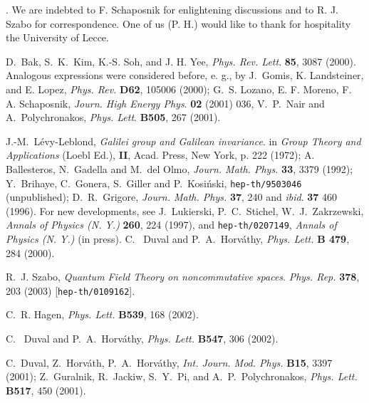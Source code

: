 \documentclass[a4paper,11pt]{article}
\def\parag{\hfil\break} %
\def\kikezd{\parag\underbar}
\begin{document}
\kikezd{Acknowledgement}.
We are indebted to F. Schaposnik
for enlightening discussions and to R. J. Szabo
for correspondence. One of us (P. H.)
would like to thank for hospitality
the University of Lecce.

\begin{thebibliography}{99}
D.~Bak, S.~K.~Kim, K.-S. Soh, and J. H. Yee,
{\sl Phys. Rev. Lett}. {\bf 85}, 3087 (2000).
Analogous expressions were considered before, e. g., by
J.~Gomis, K. Landsteiner, and E. Lopez,
{\sl Phys. Rev.} {\bf D62}, 105006 (2000);
G.~S. Lozano, E. F. Moreno, F. A. Schaposnik,
{\sl Journ. High Energy Phys}. {\bf 02} (2001) 036,
V.~P.~Nair and A.~Polychronakos,
{\sl Phys. Lett}. {\bf B505}, 267 (2001).

J.-M.~L\'evy-Leblond,
{\it Galilei group and Galilean invariance}.
in {\it Group Theory and Applications} (Loebl Ed.),
{\bf II}, Acad. Press, New York, p. 222 (1972);
A. Ballesteros, N.~Gadella and M.~del Olmo,
{\sl Journ. Math. Phys.} {\bf 33}, 3379 (1992);
Y.~Brihaye, C.~Gonera, S.~Giller and P.~Kosi\'nski,
\texttt{hep-th/9503046} (unpublished);
D.~R.~Grigore, {\sl Journ. Math. Phys.} {\bf 37}, 240 and
   {\sl ibid}. {\bf 37} 460 (1996).
For new developments, see
J.~Lukierski, P.~C.~Stichel, W.~J.~Zakrzewski,
   {\sl Annals of Physics (N. Y.)} {\bf 260}, 224 (1997), and
   \texttt{hep-th/0207149}, {\sl Annals of Physics (N. Y.)}
   (in press).
C.~ Duval and P.~A.~Horv\'athy,
{\sl Phys. Lett.} {\bf B 479}, 284 (2000). %

R.~J. Szabo,
{\it Quantum Field Theory on noncommutative spaces}.
{\sl Phys. Rep.} {\bf 378}, 203 (2003)
[\texttt{hep-th/0109162}].

C.~R. Hagen, {\sl Phys. Lett.} {\bf B539}, 168 (2002).

C.~ Duval and P.~A.~Horv\'athy,
{\sl Phys. Lett.} {\bf B547}, 306 (2002).

C.~Duval, Z.~Horv\'ath, P.~A.~Horv\'athy,
  {\sl Int. Journ. Mod. Phys.} {\bf  B15}, 3397 (2001);
Z.~Guralnik, R.~Jackiw, S.~Y.~Pi,
and A.~P.~Polychronakos,
{\sl Phys. Lett. } {\bf B517}, 450 (2001).




\end{thebibliography}
\end{document}
